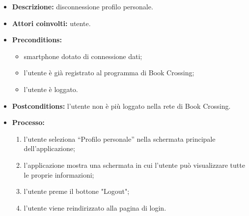 \begin{itemize}
	\begin{itemize}
		\item \textbf{Descrizione:} disconnessione profilo personale.
		\item \textbf{Attori coinvolti:} utente. 
		\item \textbf{Preconditions:} 
		\begin{itemize}
			\item smartphone dotato di connessione dati;
			\item l’utente è già registrato al programma di Book Crossing;
			\item l'utente è loggato.
		\end{itemize}
		\item \textbf{Postconditions:} l’utente non è più loggato nella rete di Book Crossing.
		\item \textbf{Processo:}
		\begin{enumerate}
			\item l’utente seleziona “Profilo personale” nella schermata principale dell’applicazione;
			\item l’applicazione mostra una schermata in cui l'utente può visualizzare tutte le proprie informazioni;
			\item l’utente preme il bottone "Logout";
			\item l’utente viene reindirizzato alla pagina di login.
		\end{enumerate}
	\end{itemize}


\end{itemize}

